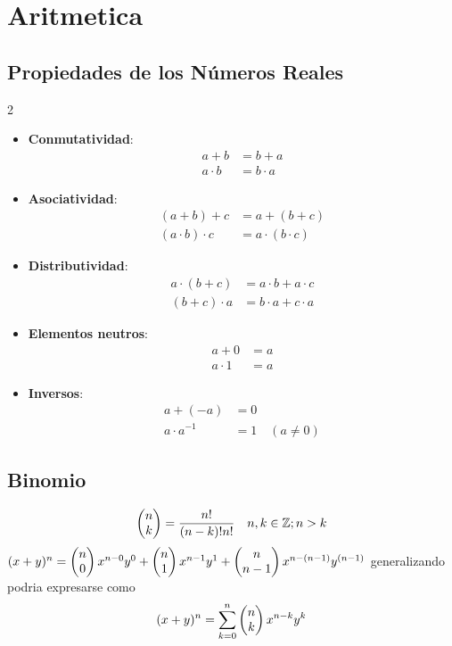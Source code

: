 \section{Aritmetica}
\subsection{Propiedades de los Números Reales}
\begin{multicols}{2}
  \begin{itemize}[leftmargin=*,noitemsep,topsep=0pt]
    \item \textbf{Conmutatividad}:
      \begin{align*}
        a + b &= b + a \\
        a \cdot b &= b \cdot a
      \end{align*}

    \item \textbf{Asociatividad}:
      \begin{align*}
        (a + b) + c &= a + (b + c) \\
        (a \cdot b) \cdot c &= a \cdot (b \cdot c)
      \end{align*}

    \item \textbf{Distributividad}:
      \begin{align*}
        a \cdot (b + c) &= a \cdot b + a \cdot c \\
        (b + c) \cdot a &= b \cdot a + c \cdot a
      \end{align*}

    \item \textbf{Elementos neutros}:
      \begin{align*}
        a + 0 &= a \\
        a \cdot 1 &= a
      \end{align*}

    \item \textbf{Inversos}:
      \begin{align*}
        a + (-a) &= 0 \\
        a \cdot a^{-1} &= 1 \quad (a \neq 0)
      \end{align*}
  \end{itemize}

  \subsection{Binomio}
  $$\begin{pmatrix} {n} \\ {k} \end{pmatrix}=\dfrac{n!}{(n-k)!n!} \quad n,k \in \mathbb{Z}; n>k$$
  $(x+y)^n=\begin{pmatrix} {n} \\ {0} \end{pmatrix}x^{n-0}y^0+\begin{pmatrix} {n} \\ {1} \end{pmatrix}x^{n-1}y^1+\begin{pmatrix} {n} \\ {n-1} \end{pmatrix}x^{n-(n-1)}y^{(n-1)}$ generalizando podria expresarse como
  $$(x+y)^n=\sum\limits_{k=0}^n \begin{pmatrix} {n} \\ {k} \end{pmatrix} x^{n-k}y^k$$


\end{multicols}
